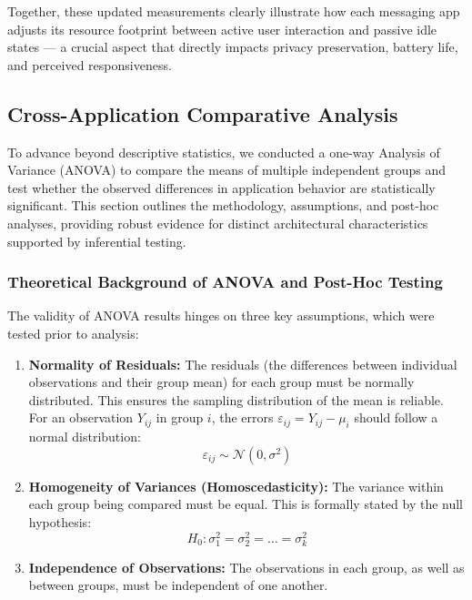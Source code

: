 \documentclass[a4paper,12pt]{report}
\begin{document}
Together, these updated measurements clearly illustrate how each messaging app adjusts its resource footprint between active user interaction and passive idle states — a crucial aspect that directly impacts privacy preservation, battery life, and perceived responsiveness.

\subsection{Cross-Application Comparative Analysis}

To advance beyond descriptive statistics, we conducted a one-way Analysis of Variance (ANOVA) to compare the means of multiple independent groups and test whether the observed differences in application behavior are statistically significant. This section outlines the methodology, assumptions, and post-hoc analyses, providing robust evidence for distinct architectural characteristics supported by inferential testing.

\subsubsection{Theoretical Background of ANOVA and Post-Hoc Testing}
The validity of ANOVA results hinges on three key assumptions, which were tested prior to analysis:
\begin{enumerate}[label=\roman*.]
    \item \textbf{Normality of Residuals:} The residuals (the differences between individual observations and their group mean) for each group must be normally distributed. This ensures the sampling distribution of the mean is reliable. For an observation \( Y_{ij} \) in group \(i\), the errors \( \varepsilon_{ij} = Y_{ij} - \mu_i \) should follow a normal distribution:
    $$ \varepsilon_{ij} \sim \mathcal{N}(0, \sigma^2) $$
    \item \textbf{Homogeneity of Variances (Homoscedasticity):} The variance within each group being compared must be equal. This is formally stated by the null hypothesis:
    $$ H_0: \sigma^2_1 = \sigma^2_2 = \dots = \sigma^2_k $$
    \item \textbf{Independence of Observations:} The observations in each group, as well as between groups, must be independent of one another.
\end{enumerate}
\end{document}
